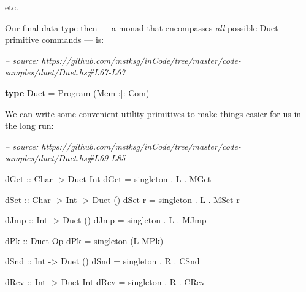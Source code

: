 \documentclass[]{article}
\newenvironment{Shaded}{}{}
\newcommand{\CommentTok}[1]{\textcolor[rgb]{0.38,0.63,0.69}{\textit{#1}}}
\newcommand{\DataTypeTok}[1]{\textcolor[rgb]{0.56,0.13,0.00}{#1}}
\newcommand{\FunctionTok}[1]{\textcolor[rgb]{0.02,0.16,0.49}{#1}}
\newcommand{\KeywordTok}[1]{\textcolor[rgb]{0.00,0.44,0.13}{\textbf{#1}}}
\newcommand{\NormalTok}[1]{#1}
\newcommand{\OtherTok}[1]{\textcolor[rgb]{0.00,0.44,0.13}{#1}}
\begin{document}
etc.

Our final data type then --- a monad that encompasses \emph{all} possible Duet
primitive commands --- is:

\begin{Shaded}
\begin{Highlighting}[]
\CommentTok{-- source: https://github.com/mstksg/inCode/tree/master/code-samples/duet/Duet.hs#L67-L67}

\KeywordTok{type} \DataTypeTok{Duet} \FunctionTok{=} \DataTypeTok{Program}\NormalTok{ (}\DataTypeTok{Mem} \FunctionTok{:|:} \DataTypeTok{Com}\NormalTok{)}
\end{Highlighting}
\end{Shaded}

We can write some convenient utility primitives to make things easier for us in
the long run:

\begin{Shaded}
\begin{Highlighting}[]
\CommentTok{-- source: https://github.com/mstksg/inCode/tree/master/code-samples/duet/Duet.hs#L69-L85}

\OtherTok{dGet ::} \DataTypeTok{Char} \OtherTok{->} \DataTypeTok{Duet} \DataTypeTok{Int}
\NormalTok{dGet }\FunctionTok{=}\NormalTok{ singleton }\FunctionTok{.} \DataTypeTok{L} \FunctionTok{.} \DataTypeTok{MGet}

\OtherTok{dSet ::} \DataTypeTok{Char} \OtherTok{->} \DataTypeTok{Int} \OtherTok{->} \DataTypeTok{Duet}\NormalTok{ ()}
\NormalTok{dSet r }\FunctionTok{=}\NormalTok{ singleton }\FunctionTok{.} \DataTypeTok{L} \FunctionTok{.} \DataTypeTok{MSet}\NormalTok{ r}

\OtherTok{dJmp ::} \DataTypeTok{Int} \OtherTok{->} \DataTypeTok{Duet}\NormalTok{ ()}
\NormalTok{dJmp }\FunctionTok{=}\NormalTok{ singleton }\FunctionTok{.} \DataTypeTok{L} \FunctionTok{.} \DataTypeTok{MJmp}

\OtherTok{dPk ::} \DataTypeTok{Duet} \DataTypeTok{Op}
\NormalTok{dPk }\FunctionTok{=}\NormalTok{ singleton (}\DataTypeTok{L} \DataTypeTok{MPk}\NormalTok{)}

\OtherTok{dSnd ::} \DataTypeTok{Int} \OtherTok{->} \DataTypeTok{Duet}\NormalTok{ ()}
\NormalTok{dSnd }\FunctionTok{=}\NormalTok{ singleton }\FunctionTok{.} \DataTypeTok{R} \FunctionTok{.} \DataTypeTok{CSnd}

\OtherTok{dRcv ::} \DataTypeTok{Int} \OtherTok{->} \DataTypeTok{Duet} \DataTypeTok{Int}
\NormalTok{dRcv }\FunctionTok{=}\NormalTok{ singleton }\FunctionTok{.} \DataTypeTok{R} \FunctionTok{.} \DataTypeTok{CRcv}
\end{Highlighting}
\end{Shaded}
\end{document}
